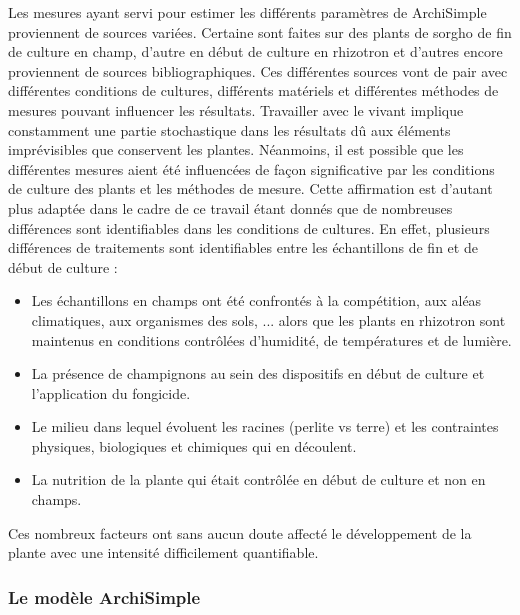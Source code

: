 Les mesures ayant servi pour estimer les différents paramètres de ArchiSimple proviennent de sources variées.
Certaine sont faites sur des plants de sorgho de fin de culture en champ, d'autre en début de culture en rhizotron et d'autres encore proviennent de sources bibliographiques.
Ces différentes sources vont de pair avec différentes conditions de cultures, différents matériels et différentes méthodes de mesures pouvant influencer les résultats. 
Travailler avec le vivant implique constamment une partie stochastique dans les résultats dû aux éléments imprévisibles que conservent les plantes.
Néanmoins, il est possible que les différentes mesures aient été influencées de façon significative par les conditions de culture des plants et les méthodes de mesure.
Cette affirmation est d'autant plus adaptée dans le cadre de ce travail étant donnés que de nombreuses différences sont identifiables dans les conditions de cultures.
En effet, plusieurs différences de traitements sont identifiables entre les échantillons de fin et de début de culture :
\begin{itemize}
    \item Les échantillons en champs ont été confrontés à la compétition, aux aléas climatiques, aux organismes des sols, ... alors que les plants en rhizotron sont maintenus en conditions contrôlées d'humidité, de températures et de lumière.
    \item La présence de champignons au sein des dispositifs en début de culture et l'application du fongicide.
    \item Le milieu dans lequel évoluent les racines (perlite vs terre) et les contraintes physiques, biologiques et chimiques qui en découlent.
    \item La nutrition de la plante qui était contrôlée en début de culture et non en champs.
\end{itemize}
Ces nombreux facteurs ont sans aucun doute affecté le développement de la plante avec une intensité difficilement quantifiable.

\subsubsection{Le modèle ArchiSimple}

